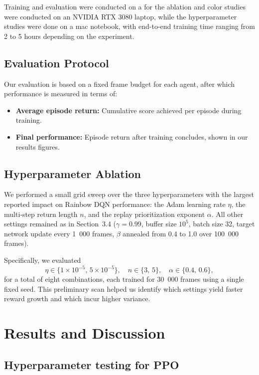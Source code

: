 \documentclass{article}
\begin{document}
Training and evaluation were conducted on a for the ablation and color studies were conducted on an NVIDIA RTX 3080 laptop, while the hyperparameter studies were done on a mac notebook, with end-to-end training time ranging from 2 to 5 hours depending on the experiment.

\subsection{Evaluation Protocol}

Our evaluation is based on a fixed frame budget for each agent, after which performance is measured in terms of:

\begin{itemize}
    \item \textbf{Average episode return:} Cumulative score achieved per episode during training.
    \item \textbf{Final performance:} Episode return after training concludes, shown in our results figures.
\end{itemize}

\subsection{Hyperparameter Ablation}
We performed a small grid sweep over the three hyperparameters with the largest reported impact on Rainbow DQN performance: the Adam learning rate \(\eta\), the multi‐step return length \(n\), and the replay prioritization exponent \(\alpha\).  All other settings remained as in Section 3.4 (\(\gamma=0.99\), buffer size \(10^5\), batch size 32, target network update every 1 000 frames, \(\beta\) annealed from 0.4 to 1.0 over 100 000 frames).

Specifically, we evaluated
\[
\eta \in \{1\times10^{-5},\,5\times10^{-5}\},\quad
n \in \{3,\,5\},\quad
\alpha \in \{0.4,\,0.6\},
\]
for a total of eight combinations, each trained for 30 000 frames using a single fixed seed.  This preliminary scan helped us identify which settings yield faster reward growth and which incur higher variance.  


\section{Results and Discussion}

\subsection{Hyperparameter testing for PPO}
\end{document}
